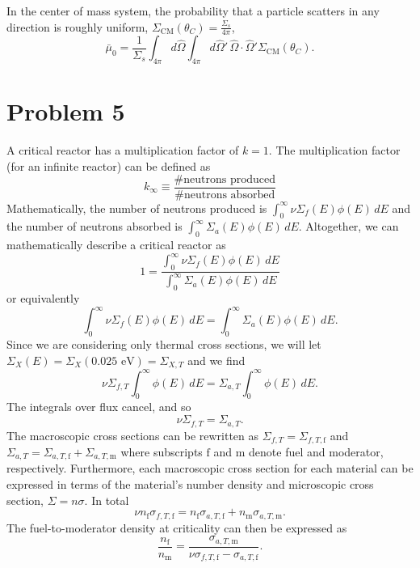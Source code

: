 \documentclass{article}
\newcommand{\Oh}{\hat{\Omega}}
\begin{document}
In the center of mass system, the probability that a particle scatters in any direction is roughly uniform, $\Sigma_{\text{CM}}(\theta_C) = \frac{\Sigma_s}{4\pi}$,
$$ \bar{\mu}_0 = \frac{1}{\Sigma_s}  \int_{4\pi} d\Oh \int_{4\pi} d\Oh' \, \Oh \cdot \Oh' \Sigma_{\text{CM}}(\theta_C) .$$



\newpage

\section*{Problem 5}

A critical reactor has a multiplication factor of $k=1$. The multiplication factor (for an infinite reactor) can be defined as
$$ k_{\infty} \equiv \frac{\text{\# neutrons produced}}{\text{\# neutrons absorbed}} $$
Mathematically, the number of neutrons produced is $\int_0^{\infty} \nu \Sigma_f(E)\phi(E)\,dE$ and the number of neutrons absorbed is $\int_0^{\infty} \Sigma_a(E)\phi(E)\,dE$. Altogether, we can mathematically describe a critical reactor as 
$$ 1 = \frac{\int_0^{\infty} \nu \Sigma_f(E)\phi(E)\,dE}{\int_0^{\infty} \Sigma_a(E)\phi(E)\,dE} $$
or equivalently
$$ \int_0^{\infty} \nu \Sigma_f(E)\phi(E)\,dE = \int_0^{\infty} \Sigma_a(E)\phi(E)\,dE. $$
Since we are considering only thermal cross sections, we will let $\Sigma_X(E) = \Sigma_X(0.025\text{ eV}) = \Sigma_{X,T}$ and we find
$$ \nu \Sigma_{f,T} \int_0^{\infty} \phi(E)\,dE = \Sigma_{a,T} \int_0^{\infty} \phi(E)\,dE. $$
The integrals over flux cancel, and so
$$ \nu \Sigma_{f,T} = \Sigma_{a,T} .$$
The macroscopic cross sections can be rewritten as $\Sigma_{f,T} = \Sigma_{f,T,\text{f}}$ and $\Sigma_{a,T} = \Sigma_{a,T,\text{f}} + \Sigma_{a,T,\text{m}}$ where subscripts $\text{f}$ and $\text{m}$ denote fuel and moderator, respectively. Furthermore, each macroscopic cross section for each material can be expressed in terms of the material's number density and microscopic cross section, $\Sigma = n\sigma$. In total
$$ \nu n_{\text{f}} \sigma_{f,T,\text{f}} = n_{\text{f}} \sigma_{a,T,\text{f}} + n_{\text{m}} \sigma_{a,T,\text{m}} .$$
The fuel-to-moderator density at criticality can then be expressed as
$$ \frac{n_{\text{f}}}{n_{\text{m}}} = \frac{\sigma_{a,T,\text{m}}}{\nu \sigma_{f,T,\text{f}} - \sigma_{a,T,\text{f}}} .$$
\-\\
\end{document}
